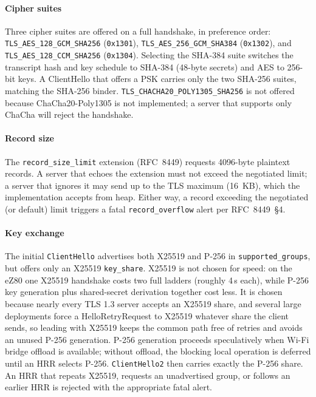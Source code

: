 \documentclass[titlepage]{report}
\begin{document}
	\paragraph{Cipher suites}
	Three cipher suites are offered on a full handshake, in preference order: \texttt{TLS\_AES\_128\_GCM\_SHA256} (\texttt{0x1301}), \texttt{TLS\_AES\_256\_GCM\_SHA384} (\texttt{0x1302}), and \texttt{TLS\_AES\_128\_CCM\_SHA256} (\texttt{0x1304}). Selecting the SHA-384 suite switches the transcript hash and key schedule to SHA-384 (48-byte secrets) and AES to 256-bit keys. A ClientHello that offers a PSK carries only the two SHA-256 suites, matching the SHA-256 binder. \texttt{TLS\_CHACHA20\_POLY1305\_SHA256} is not offered because ChaCha20-Poly1305 is not implemented; a server that supports only ChaCha will reject the handshake.

	\paragraph{Record size}
	The \texttt{record\_size\_limit} extension (RFC~8449) requests 4096-byte plaintext records. A server that echoes the extension must not exceed the negotiated limit; a server that ignores it may send up to the TLS maximum (16~KB), which the implementation accepts from heap. Either way, a record exceeding the negotiated (or default) limit triggers a fatal \texttt{record\_overflow} alert per RFC~8449~\S4.

	\paragraph{Key exchange}
	The initial \texttt{ClientHello} advertises both X25519 and P-256 in \texttt{supported\_groups}, but offers only an X25519 \texttt{key\_share}. X25519 is not chosen for speed: on the eZ80 one X25519 handshake costs two full ladders (roughly 4\,s each), while P-256 key generation plus shared-secret derivation together cost less. It is chosen because nearly every TLS 1.3 server accepts an X25519 share, and several large deployments force a HelloRetryRequest to X25519 whatever share the client sends, so leading with X25519 keeps the common path free of retries and avoids an unused P-256 generation. P-256 generation proceeds speculatively when Wi-Fi bridge offload is available; without offload, the blocking local operation is deferred until an HRR selects P-256. \texttt{ClientHello2} then carries exactly the P-256 share. An HRR that repeats X25519, requests an unadvertised group, or follows an earlier HRR is rejected with the appropriate fatal alert.
\end{document}
